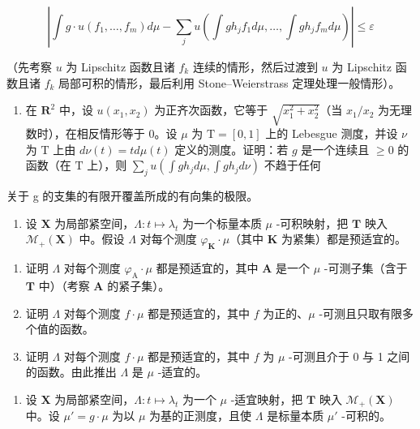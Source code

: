 \[
\left| \int g \cdot u (f _ {1}, \dots , f _ {m}) d \mu - \sum_ {j} u \left(\int g h _ {j} f _ {1} d \mu , \dots , \int g h _ {j} f _ {m} d \mu\right) \right| \leqslant \varepsilon
\]

（先考察 \(u\) 为 Lipschitz 函数且诸 \(f_k\) 连续的情形，然后过渡到 \(u\) 为 Lipschitz 函数且诸 \(f_k\) 局部可积的情形，最后利用 Stone--Weierstrass 定理处理一般情形）。

\begin{enumerate}
\def\labelenumi{\alph{enumi})}
\setcounter{enumi}{3}
\tightlist
\item
  在 \(\mathbf{R}^2\) 中，设 \(u(x_1, x_2)\) 为正齐次函数，它等于 \(\sqrt{x_1^2 + x_2^2}\)（当 \(x_1 / x_2\) 为无理数时），在相反情形等于 0。设 \(\mu\) 为 \(\mathrm{T} = [0, 1]\) 上的 Lebesgue 测度，并设 \(\nu\) 为 \(\mathrm{T}\) 上由 \(d\nu(t) = t d\mu(t)\) 定义的测度。证明：若 \(g\) 是一个连续且 \(\geqslant 0\) 的函数（在 \(\mathrm{T}\) 上），则 \(\sum_{j} u\left( \int gh_j d\mu, \int gh_j d\nu \right)\) 不趋于任何
\end{enumerate}

关于 g 的支集的有限开覆盖所成的有向集的极限。

\begin{enumerate}
\def\labelenumi{\arabic{enumi})}
\setcounter{enumi}{26}
\tightlist
\item
  设 \(\mathbf{X}\) 为局部紧空间，\(\Lambda : t \mapsto \lambda_t\) 为一个标量本质 \(\mu\) -可积映射，把 \(\mathbf{T}\) 映入 \(\mathcal{M}_+(\mathbf{X})\) 中。假设 \(\Lambda\) 对每个测度 \(\varphi_{\mathbf{K}} \cdot \mu\)（其中 \(\mathbf{K}\) 为紧集）都是预适宜的。
\end{enumerate}

\begin{enumerate}
\def\labelenumi{\alph{enumi})}
\item
  证明 \(\Lambda\) 对每个测度 \(\varphi_{\mathrm{A}}\cdot \mu\) 都是预适宜的，其中 \(\mathbf{A}\) 是一个 \(\mu\) -可测子集（含于 \(\mathbf{T}\) 中）（考察 \(\mathbf{A}\) 的紧子集）。
\item
  证明 \(\Lambda\) 对每个测度 \(f \cdot \mu\) 都是预适宜的，其中 \(f\) 为正的、\(\mu\) -可测且只取有限多个值的函数。
\item
  证明 \(\Lambda\) 对每个测度 \(f \cdot \mu\) 都是预适宜的，其中 \(f\) 为 \(\mu\) -可测且介于 0 与 1 之间的函数。由此推出 \(\Lambda\) 是 \(\mu\) -适宜的。
\end{enumerate}

\begin{enumerate}
\def\labelenumi{\arabic{enumi})}
\setcounter{enumi}{27}
\tightlist
\item
  设 \(\mathbf{X}\) 为局部紧空间，\(\Lambda : t \mapsto \lambda_t\) 为一个 \(\mu\) -适宜映射，把 \(\mathbf{T}\) 映入 \(\mathcal{M}_+(\mathbf{X})\) 中。设 \(\mu' = g \cdot \mu\) 为以 \(\mu\) 为基的正测度，且使 \(\Lambda\) 是标量本质 \(\mu'\) -可积的。
\end{enumerate}

